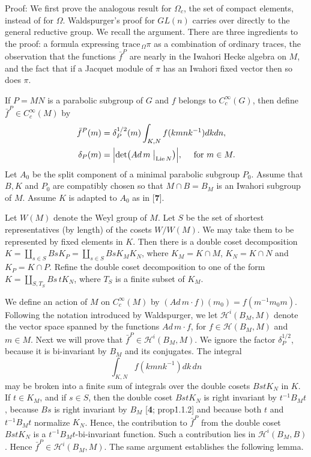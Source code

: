 \documentclass{amsart}
\begin{document}
\pproclaim Proof:
We first prove the analogous result for $\Omega_c$, the set of 
compact elements, instead of for $\Omega$.
Waldspurger's proof for 
  $ GL(n) $
carries over directly to the general reductive group.
We recall the argument.
There are three ingredients to the proof:
a formula expressing
  $ \text{trace}_{\,\Omega} \pi $
as a combination of ordinary traces, 
the observation that the functions 
  $ \bar f^P $
are nearly in the Iwahori Hecke algebra on $M$,
and the fact that if a Jacquet module of
  $ \pi $
has an Iwahori fixed vector then so does 
  $ \pi $.

If
  $ P = MN $
is a parabolic subgroup of $G$ and
  $ f$ belongs to $C_c^{\infty} (G) $, then
define 
  $ \bar f^P \in C_c^{\infty} (M) $
by
%
\begin{align*}
  \bar f^P (m) &=
    \delta_P^{1/2} (m)
    \int_{K,N}
    f (kmnk^{-1}) dkdn, \\
\vspace{4pt}
  \delta_P(m) &=
     \Bigl|
       \det
       \bigl(
          Ad\,m \bigm|_{\text{Lie}\,N}
       \bigr)
     \Bigr|,
     \quad\text { for }
     m \in M.
\end{align*}
%
Let $A_0$ be the split component of a minimal parabolic subgroup
  $P_0$.  Assume that $ B, K$ and $P_0 $ are compatibly chosen so that
  $ M \cap B = B_M $ is an Iwahori subgroup of $M$.  Assume $K$ is
  adapted to $ A_0 $ as in [{\bf 7}].

Let $W (M)$ denote the Weyl group of $M$.
Let $S$ be the set of shortest representatives (by length)
of the cosets 
  $ W/W(M) $.
We may take them to be represented by fixed elements in $K$.
Then there is a double coset decomposition
  $ K = 
    \coprod_{s \in S} 
      B s K_P =
    \coprod_{s \in S }
      B s K_M K_N $,
where 
  $ K_M =
    K \cap M $,
  $ K_N = K \cap N $ and
  $ K_P = K \cap P $.
Refine the double coset decomposition to one of the form
$K=\coprod_{S,T_S} B s\,t K_N$, where $T_S$ is a finite
subset of $K_M$.   

We define an action
of $M$ on $C_c^\infty(M)$ by
  $ (Ad\,m \cdot f) (m_0) = f (m^{-1} m_0 m) $.
Following the notation introduced by Waldspurger, we let 
  $ {\mathcal H}^i (B_M, M) $
denote the vector space spanned by the functions
  $ Ad\,m \cdot f $, for
  $ f \in {\mathcal H} (B_M, M) $ and
  $ m \in M $.
Next we will prove that
  $ \bar f^P \in {\mathcal H}^i (B_M, M) $.
We ignore the factor
  $ \delta_P^{1/2} $, because
it is bi-invariant by 
  $ B_M $
and its conjugates.
The integral
$$\int_{K,N} f(kmnk^{-1}) dk\,dn$$
may be broken into a finite sum of integrals over the double cosets
$BstK_N$ in $K$.   If $t\in K_M$, and if $s\in S$, then the double coset 
$BstK_N$ is right invariant by $t^{-1}B_Mt$, because $Bs$ is right
invariant by $B_M$  [{\bf 4}; prop\. 1.1.2] 
and because both $t$ and $t^{-1}B_Mt$ normalize $K_N$.
Hence, the contribution to $\bar f^P$ from the double coset $BstK_N$
is a $t^{-1}B_Mt$-bi-invariant function.  Such a contribution
lies in ${\mathcal H}^i(B_M,B)$.  Hence $\bar f^P\in {\mathcal H}^i(B_M,M)$.
The same argument establishes the following lemma.
\end{document}
